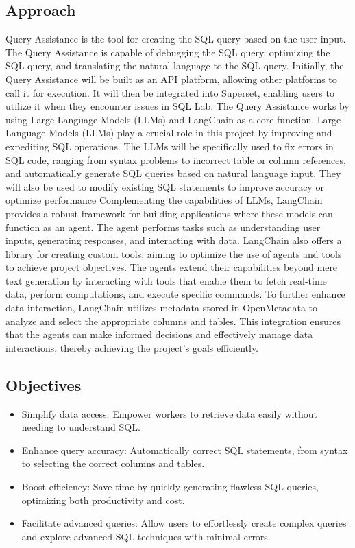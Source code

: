     \subsection{Approach}
    Query Assistance is the tool for creating the SQL query based on the user input. The Query Assistance is capable of debugging  the SQL query, optimizing  the SQL query, and translating the natural language to the SQL query. Initially, the Query Assistance will be built as an API platform, allowing other platforms to call it for execution. It will then be integrated into Superset, enabling users to utilize it when they encounter issues in SQL Lab. The Query Assistance works by using Large Language Models (LLMs) and LangChain as a core function. Large Language Models (LLMs) play a crucial role in this project by improving and expediting SQL operations. The LLMs will be specifically used to fix errors in SQL code, ranging from syntax problems to incorrect table or column references, and automatically generate SQL queries based on natural language input. They will also be used to modify existing SQL statements to improve accuracy or optimize performance Complementing the capabilities of LLMs, LangChain provides a robust framework for building applications where these models can function as an agent. The agent performs tasks such as understanding user inputs, generating responses, and interacting with data. LangChain also offers a library for creating custom tools, aiming to optimize the use of agents and tools to achieve project objectives. The agents extend their capabilities beyond mere text generation by interacting with tools that enable them to fetch real-time data, perform computations, and execute specific commands. To further enhance data interaction, LangChain utilizes metadata stored in OpenMetadata to analyze and select the appropriate columns and tables. This integration ensures that the agents can make informed decisions and effectively manage data interactions, thereby achieving the project's goals efficiently.
    \subsection{Objectives}
        \begin{itemize}
        \item  Simplify data access: Empower workers to retrieve data easily without needing to understand SQL.
        \item  Enhance query accuracy: Automatically correct SQL statements, from syntax to selecting the correct columns and tables.
        \item  Boost efficiency: Save time by quickly generating flawless SQL queries, optimizing both productivity and cost.
        \item  Facilitate advanced queries: Allow users to effortlessly create complex queries and explore advanced SQL techniques with minimal errors.
        \end{itemize}

